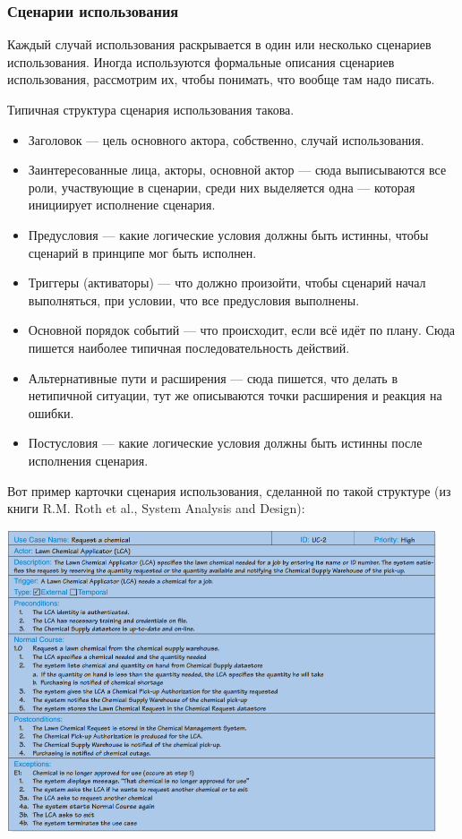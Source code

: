 \documentclass{../../text-style}
\begin{document}
\subsubsection{Сценарии использования}

Каждый случай использования раскрывается в один или несколько сценариев использования. Иногда используются формальные описания сценариев использования, рассмотрим их, чтобы понимать, что вообще там надо писать.

Типичная структура сценария использования такова.

\begin{itemize}
    \item Заголовок --- цель основного актора, собственно, случай использования.
    \item Заинтересованные лица, акторы, основной актор --- сюда выписываются все роли, участвующие в сценарии, среди них выделяется одна --- которая инициирует исполнение сценария.
    \item Предусловия --- какие логические условия должны быть истинны, чтобы сценарий в принципе мог быть исполнен.
    \item Триггеры (активаторы) --- что должно произойти, чтобы сценарий начал выполняться, при условии, что все предусловия выполнены.
    \item Основной порядок событий --- что происходит, если всё идёт по плану. Сюда пишется наиболее типичная последовательность действий.
    \item Альтернативные пути и расширения --- сюда пишется, что делать в нетипичной ситуации, тут же описываются точки расширения и реакция на ошибки.
    \item Постусловия --- какие логические условия должны быть истинны после исполнения сценария.
\end{itemize}

Вот пример карточки сценария использования, сделанной по такой структуре (из книги  R.M. Roth et al., System Analysis and Design):

\begin{center}
    \includegraphics[width=0.95\textwidth]{useCaseExample.png}
\end{center}
\end{document}
